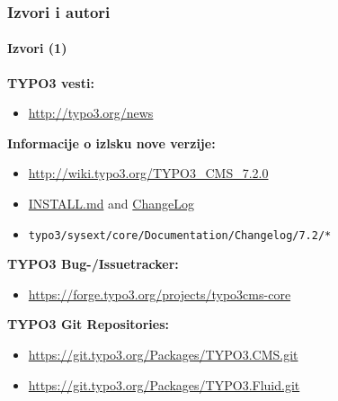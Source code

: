\begin{frame}[fragile]
	\frametitle{Izvori i autori}
	\framesubtitle{Izvori (1)}

	\textbf{TYPO3 vesti:}
		\begin{itemize}\smaller
			\item \url{http://typo3.org/news}
		\end{itemize}

	\textbf{Informacije o izlsku nove verzije:}
		\begin{itemize}\smaller
			\item \url{http://wiki.typo3.org/TYPO3_CMS_7.2.0}
			\item \href{https://github.com/TYPO3/TYPO3.CMS/blob/master/INSTALL.md}{INSTALL.md} and \href{https://github.com/TYPO3/TYPO3.CMS/blob/master/ChangeLog}{ChangeLog}
			\item \texttt{typo3/sysext/core/Documentation/Changelog/7.2/*}
		\end{itemize}

	\textbf{TYPO3 Bug-/Issuetracker:}
		\begin{itemize}\smaller
			\item \url{https://forge.typo3.org/projects/typo3cms-core}
		\end{itemize}

	\textbf{TYPO3 Git Repositories:}
		\begin{itemize}\smaller
			\item \url{https://git.typo3.org/Packages/TYPO3.CMS.git}
			\item \url{https://git.typo3.org/Packages/TYPO3.Fluid.git}
		\end{itemize}

\end{frame}


